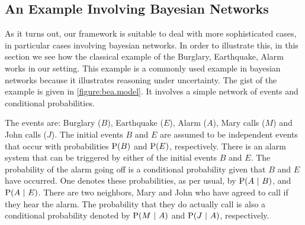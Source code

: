 \documentclass{article}
\renewcommand{\cite}{\citep}
\begin{document}
\subsection{An Example Involving Bayesian Networks}\label{subsec:example.bayesian.networks}
%
%
%
As it turns out, our framework is suitable to deal with more
sophisticated cases, in particular cases involving bayesian networks.
In order to illustrate this, in this section we see how the classical
example of the Burglary, Earthquake, Alarm \cite{judea88probabilistic} works in our
setting.  This example is a commonly used example in bayesian networks
because it illustrates reasoning under uncertainty.  The gist of the
example is given in \cref{figure:bea.model}.  It involves a simple network
of events and conditional probabilities.

The events are: Burglary (\(B\)), Earthquake (\(E\)), Alarm (\(A\)),
Mary calls (\(M\)) and John calls (\(J\)).  The initial events \(B\)
and \(E\) are assumed to be independent events that occur with
probabilities \(\pr{B}\) and \(\pr{E}\), respectively.  There is an
alarm system that can be triggered by either of the initial events
\(B\) and \(E\).  The probability of the alarm going off is a
conditional probability given that \(B\) and \(E\) have occurred.  One
denotes these probabilities, as per usual, by \(\pr{A \given B}\), and
\(\pr{A \given E}\).  There are two neighbors, Mary and John who have
agreed to call if they hear the alarm.  The probability that they do
actually call is also a conditional probability denoted by
\(\pr{M \given A}\) and \(\pr{J \given A}\), respectively.
\end{document}
